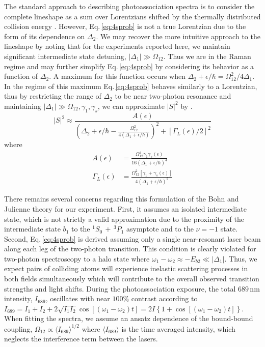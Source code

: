 The standard approach to describing photoassociation spectra is to consider the complete lineshape as a sum over Lorentzians shifted by the thermally distributed collision energy \cite{Julienne1989,Napolitano1994,Cote1995}.
However, Eq.\,\ref{eq:4sprob} is not a true Lorentzian due to the form of its dependence on $\Delta_2$.
We may recover the more intuitive approach to the lineshape by noting that for the experiments reported here, we maintain significant intermediate state detuning, $|\Delta_1| \gg \Omega_{12}$.
Thus we are in the Raman regime and may further simplify Eq.\,\ref{eq:4sprob} by considering its behavior as a function of $\Delta_2$.
A maximum for this function occurs when $\Delta_2 + \epsilon/\hbar = \Omega_{12}^2/4 \Delta_1$.
In the regime of this maximum Eq.\,\ref{eq:4sprob} behaves similarly to a Lorentzian, thus by restricting the range of $\Delta_2$ to be near two-photon resonance and maintaining $|\Delta_1| \gg \Omega_{12}, \gamma_1, \gamma_s$, we can approximate $\vert  S \vert^2$ by \cite{Pachomov2017, Pachomow2017a}.
\begin{equation}
 \vert S\vert^2 \approx \frac{A(\epsilon)}{\left( \Delta_2+\epsilon/\hbar-\frac{\Omega_{12}^{2}} {4(\Delta_1+\epsilon/\hbar)}\right)^2+\left[ {\Gamma_L(\epsilon)}/{2}\right]^2}
\end{equation}
where 
\begingroup
\addtolength{\jot}{1em}
\begin{align}
  A(\epsilon) &= \frac{\Omega_{12}^{4}\gamma_1 \gamma_s(\epsilon)}{16(\Delta_1+\epsilon/\hbar)^4} \\
  \Gamma_L(\epsilon) &= \frac{\Omega_{12}^{2}[\gamma_1 +\gamma_s(\epsilon)]}{4(\Delta_1+\epsilon/\hbar)^2}
\end{align}
\endgroup

There remains several concerns regarding this formulation of the Bohn and Julienne theory for our experiment.
First, it assumes an isolated intermediate state, which is not strictly a valid approximation due to the proximity of the intermediate state $b_1$ to the $^1S_0\,+\,^3P_1$ asymptote and to the $\nu = -1$ state.
Second, Eq.\,\ref{eq:4sprob} is derived assuming only a single near-resonant laser beam along each leg of the two-photon transition.
This condition is clearly violated for two-photon spectroscopy to a halo state where $\omega_1 - \omega_2 \approx -E_{b2} \ll |\Delta_1|$.
Thus, we expect pairs of colliding atoms will experience inelastic scattering processes in both fields simultaneously which will contribute to the overall observed transition strengths and light shifts.
During the photoassociation exposure, the total $689\,\text{nm}$ intensity, $I_{\text{689}}$, oscillates with near $100$\% contrast according to $I_{\text{689}}=I_1+I_2+2\sqrt{I_1I_2}\cos \left[(\omega_1-\omega_2)t \right]=2I\left\{1+\cos \left[(\omega_1-\omega_2)t \right]\right\}$.
When fitting the spectra, we assume an ansatz dependence of the bound-bound coupling, $\Omega_{12} \propto \langle I_{689} \rangle^{1/2}$ where $\langle I_{689} \rangle$ is the time averaged intensity, which neglects the interference term between the lasers.

